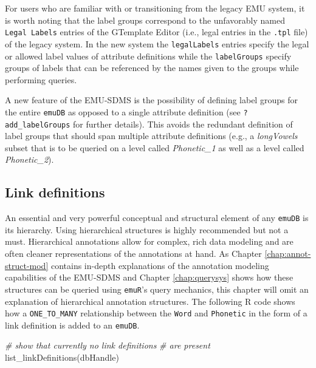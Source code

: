 \documentclass[
]{book}
\newenvironment{Shaded}{\begin{snugshade}}{\end{snugshade}}
\newcommand{\CommentTok}[1]{\textcolor[rgb]{0.56,0.35,0.01}{\textit{#1}}}
\newcommand{\FunctionTok}[1]{\textcolor[rgb]{0.00,0.00,0.00}{#1}}
\newcommand{\NormalTok}[1]{#1}
\begin{document}
For users who are familiar with or transitioning from the legacy EMU system, it is worth noting that the label groups correspond to the unfavorably named \texttt{Legal\ Labels} entries of the GTemplate Editor (i.e., legal entries in the \texttt{.tpl} file) of the legacy system. In the new system the \texttt{legalLabels} entries specify the legal or allowed label values of attribute definitions while the \texttt{labelGroups} specify groups of labels that can be referenced by the names given to the groups while performing queries.

A new feature of the EMU-SDMS is the possibility of defining label groups for the entire \texttt{emuDB} as opposed to a single attribute definition (see \texttt{?add\_labelGroups} for further details). This avoids the redundant definition of label groups that should span multiple attribute definitions (e.g., a \emph{longVowels} subset that is to be queried on a level called \emph{Phonetic\_1} as well as a level called \emph{Phonetic\_2}).

\hypertarget{link-definitions}{%
\subsection{Link definitions}\label{link-definitions}}

An essential and very powerful conceptual and structural element of any \texttt{emuDB} is its hierarchy. Using hierarchical structures is highly recommended but not a must. Hierarchical annotations allow for complex, rich data modeling and are often cleaner representations of the annotations at hand. As Chapter \ref{chap:annot-struct-mod} contains in-depth explanations of the annotation modeling capabilities of the EMU-SDMS and Chapter \ref{chap:querysys} shows how these structures can be queried using \texttt{emuR}'s query mechanics, this chapter will omit an explanation of hierarchical annotation structures. The following R code shows how a \texttt{ONE\_TO\_MANY} relationship between the \texttt{Word} and \texttt{Phonetic} in the form of a link definition is added to an \texttt{emuDB}.

\begin{Shaded}
\begin{Highlighting}[]
\CommentTok{\# show that currently no link definitions}
\CommentTok{\# are present}
\FunctionTok{list\_linkDefinitions}\NormalTok{(dbHandle)}
\end{Highlighting}
\end{Shaded}
\end{document}
